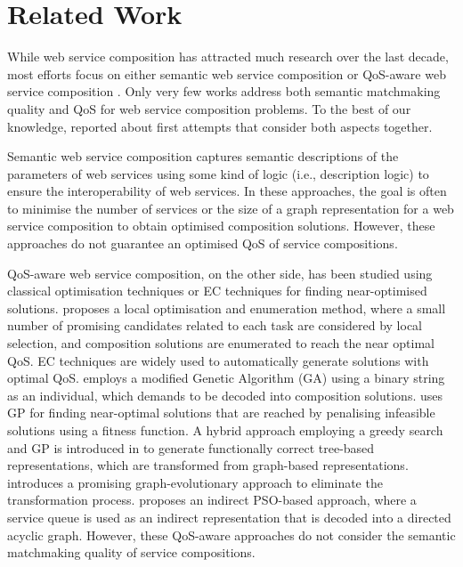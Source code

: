 \documentclass{llncs}
\begin{document}
\section{Related Work} \label{relatedWork}
While web service composition has attracted much research over the last decade, most efforts focus on either semantic web service composition \cite{bansal2016generalized,boustil2014semantic,mier2015integrated} or QoS-aware web service composition \cite{gupta2015optimization,ma2015hybrid,qi2010combining,da2016particle,da2015graphevol,yu2013adaptive}. Only very few works address both semantic matchmaking quality and QoS for web service composition problems. To the best of our knowledge, \cite{fanjiang2014semantic,lecue2009optimizing,pop2009immune} reported about first attempts that consider both aspects together.

Semantic web service composition \cite{bansal2016generalized,boustil2014semantic,mier2015integrated} captures semantic descriptions of the parameters of web services using some kind of logic (i.e., description logic) to ensure the interoperability of web services. In these approaches, the goal is often to minimise the number of services or the size of a graph representation for a web service composition to obtain optimised composition solutions. However, these approaches do not guarantee an optimised QoS of service compositions.

QoS-aware web service composition, on the other side, has been studied using classical optimisation techniques or EC techniques for finding near-optimised solutions. \cite{qi2010combining} proposes a local optimisation and enumeration method, where a small number of promising candidates related to each task are considered by local selection, and composition solutions are enumerated to reach the near optimal QoS. EC techniques are widely used to automatically generate solutions with optimal QoS. \cite{gupta2015optimization} employs a modified Genetic Algorithm (GA) using a binary string as an individual, which demands to be decoded into composition solutions. \cite{yu2013adaptive} uses GP for finding near-optimal solutions that are reached by penalising infeasible solutions using a fitness function. A hybrid approach employing a greedy search and GP is introduced in \cite{ma2015hybrid} to generate functionally correct tree-based representations, which are transformed from graph-based representations. \cite{da2015graphevol} introduces a promising graph-evolutionary approach to eliminate the transformation process. \cite{da2016particle} proposes an indirect PSO-based approach, where a service queue is used as an indirect representation that is decoded into a directed acyclic graph. However, these QoS-aware approaches \cite{gupta2015optimization,qi2010combining,ma2015hybrid,da2016particle,da2015graphevol,yu2013adaptive} do not consider the semantic matchmaking quality of service compositions.
\end{document}
